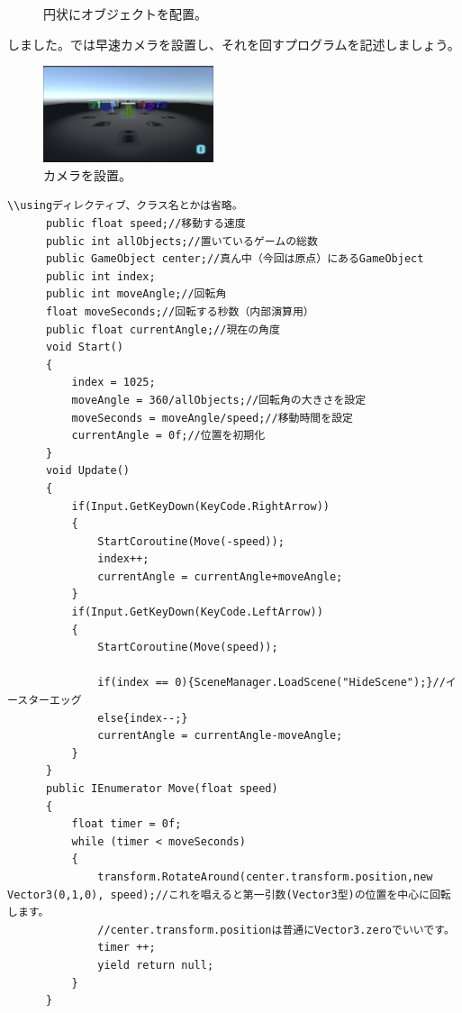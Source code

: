 \documentclass[b5paper,9pt,platex,dvipdfmx]{jsarticle}
\begin{document}
\begin{multicols}{3}
\begin{figure}[H]
  \caption{円状にオブジェクトを配置。}
\end{figure}
しました。では早速カメラを設置し、それを回すプログラムを記述しましょう。\\
\begin{figure}[H]
  \centering
  \includegraphics[width=5cm]{3.png}
  \caption{カメラを設置。}
\end{figure}
\end{multicols}
\begin{lstlisting}[caption=MoveNext.cs]
\\usingディレクティブ、クラス名とかは省略。
      public float speed;//移動する速度
      public int allObjects;//置いているゲームの総数
      public GameObject center;//真ん中（今回は原点）にあるGameObject
      public int index;
      public int moveAngle;//回転角
      float moveSeconds;//回転する秒数（内部演算用）
      public float currentAngle;//現在の角度
      void Start()
      {
          index = 1025;
          moveAngle = 360/allObjects;//回転角の大きさを設定
          moveSeconds = moveAngle/speed;//移動時間を設定
          currentAngle = 0f;//位置を初期化
      }
      void Update()
      {
          if(Input.GetKeyDown(KeyCode.RightArrow))
          {
              StartCoroutine(Move(-speed));
              index++;
              currentAngle = currentAngle+moveAngle;
          }
          if(Input.GetKeyDown(KeyCode.LeftArrow))
          {
              StartCoroutine(Move(speed));

              if(index == 0){SceneManager.LoadScene("HideScene");}//イースターエッグ
              else{index--;}
              currentAngle = currentAngle-moveAngle;
          }
      }
      public IEnumerator Move(float speed)
      {
          float timer = 0f;
          while (timer < moveSeconds)
          {
              transform.RotateAround(center.transform.position,new Vector3(0,1,0), speed);//これを唱えると第一引数(Vector3型)の位置を中心に回転します。
              //center.transform.positionは普通にVector3.zeroでいいです。
              timer ++;
              yield return null;
          }
      }
\end{lstlisting}
\end{document}
